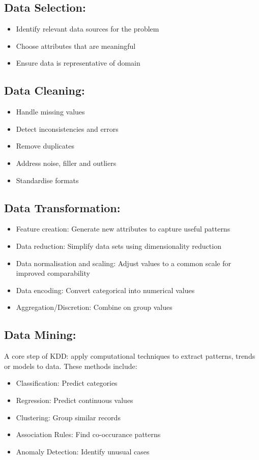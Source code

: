 \documentclass[a5paper]{article}
\begin{document}
	\subsection{Data Selection:}
	\begin{itemize}
		\item Identify relevant data sources for the problem
		\item Choose attributes that are meaningful
		\item Ensure data is representative of domain
	\end{itemize}
	\subsection{Data Cleaning:}
	\begin{itemize}
		\item Handle missing values
		\item Detect inconsistencies and errors
		\item Remove duplicates
		\item Address noise, filler and outliers
		\item Standardise formats
	\end{itemize}
	\subsection{Data Transformation:}
	\begin{itemize}
		\item Feature creation: Generate new attributes to capture useful patterns
		\item Data reduction: Simplify data sets using dimensionality reduction
		\item Data normalisation and scaling: Adjust values to a common scale for improved comparability
		\item Data encoding: Convert categorical into numerical values
		\item Aggregation/Discretion: Combine on group values
	\end{itemize}
	\subsection{Data Mining:}
	A core step of KDD: apply computational techniques to extract patterns, trends or models to data. These methods include:
	\begin{itemize}
		\item Classification: Predict categories
		\item Regression: Predict continuous values
		\item Clustering: Group similar records
		\item Association Rules: Find co-occurance patterns
		\item Anomaly Detection:  Identify unusual cases
	\end{itemize}
\end{document}
